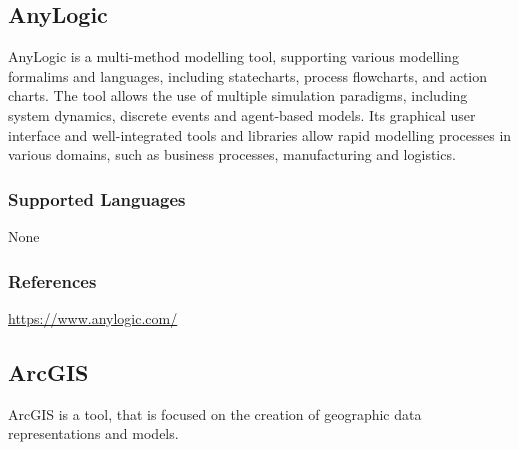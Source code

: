 \subsection{AnyLogic}
\label{subsecT:AnyLogic}

AnyLogic is a multi-method modelling tool, supporting various modelling formalims and languages, including statecharts, process flowcharts, and action charts. 
The tool allows the use of multiple simulation paradigms, including system dynamics, discrete events and agent-based models.
Its graphical user interface and well-integrated tools and libraries allow rapid modelling processes in various domains, such as business processes, manufacturing and logistics.


\subsubsection{Supported Languages}

None


\subsubsection{References}

\url{https://www.anylogic.com/}



\subsection{ArcGIS}
\label{subsecT:ArcGIS}


ArcGIS is a tool, that is focused on the creation of geographic data representations and models.

